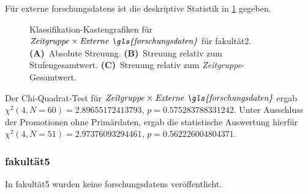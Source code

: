 Für externe \glspl{forschungsdaten} ist die deskriptive Statistik in \cref{fig:faculty_c_sampled_evaluated_adjusted_factors-only_Zeitgruppe_x_Externe.FD_absolute_boxplot} gegeben.
\begin{figure}[!htbp]
    \centering%
    \resizebox{.33\textwidth}{!}{}%
    \resizebox{.33\textwidth}{!}{}%
    \resizebox{.33\textwidth}{!}{}%
    \caption{Klassifikation-Kastengrafiken für $\text{\textit{Zeitgruppe}}\times\text{\textit{Externe \gls{forschungsdaten}}}$ für \gls{fakultät2}. \textbf{(A)}~Absolute Streuung. \textbf{(B)}~Streuung relativ zum Stufengesamtwert. \textbf{(C)}~Streuung relativ zum \textit{Zeitgruppe}-Gesamtwert.}
    \label{fig:faculty_c_sampled_evaluated_adjusted_factors-only_Zeitgruppe_x_Externe.FD_absolute_boxplot}
\end{figure} 
Der Chi-Quadrat-Test für $\text{\textit{Zeitgruppe}}\times\text{\textit{Externe \gls{forschungsdaten}}}$ ergab $\chi^2 (\num{4}, N = \num{60}) = \num[round-mode=places,round-precision=3]{2.89655172413793}$, $p = \num[round-mode=places,round-precision=3]{0.575283788331242}$.
Unter Ausschluss der Promotionen ohne Primärdaten, ergab die statistische Auswertung hierfür $\chi^2 (\num{4}, N = \num{51}) = \num[round-mode=places,round-precision=3]{2.97376093294461}$, $p = \num[round-mode=places,round-precision=3]{0.562226004804371}$.

\subsubsection{\gls{fakultät5}}
In \gls{fakultät5} wurden keine \glspl{forschungsdaten} veröffentlicht.


